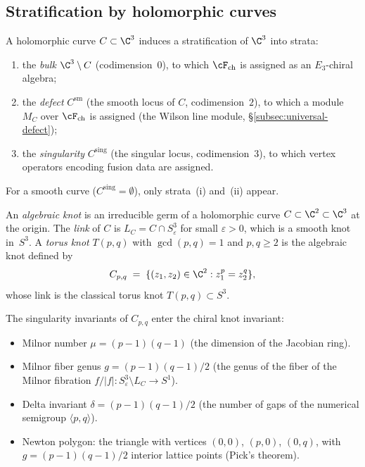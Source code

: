 \subsection{Stratification by holomorphic curves}
\label{subsec:strat-hol-curves}

A holomorphic curve $C \subset \C^3$ induces a stratification of $\C^3$ into strata:
\begin{enumerate}[label=\textup{(\roman*)}]
 \item the \emph{bulk} $\C^3 \setminus C$ (codimension~$0$), to which $\cF_{\mathrm{ch}}$ is assigned as an $E_3$-chiral algebra;
 \item the \emph{defect} $C^{\mathrm{sm}}$ (the smooth locus of $C$, codimension~$2$), to which a module $M_C$ over $\cF_{\mathrm{ch}}$ is assigned (the Wilson line module, \S\ref{subsec:universal-defect});
 \item the \emph{singularity} $C^{\mathrm{sing}}$ (the singular locus, codimension~$3$), to which vertex operators encoding fusion data are assigned.
\end{enumerate}
For a smooth curve ($C^{\mathrm{sing}} = \emptyset$), only strata~(i) and~(ii) appear.

\begin{definition}
\label{def:algebraic-knot}
An \emph{algebraic knot} is an irreducible germ of a holomorphic curve $C \subset \C^2 \subset \C^3$ at the origin. The \emph{link} of $C$ is $L_C = C \cap S^3_\varepsilon$ for small $\varepsilon > 0$, which is a smooth knot in~$S^3$. A \emph{torus knot} $T(p, q)$ with $\gcd(p, q) = 1$ and $p, q \geq 2$ is the algebraic knot defined by
\[
 C_{p,q} \;=\; \{(z_1, z_2) \in \C^2 : z_1^p = z_2^q\},
\]
whose link is the classical torus knot $T(p, q) \subset S^3$.
\end{definition}

The singularity invariants of $C_{p,q}$ enter the chiral knot invariant:
\begin{itemize}
 \item Milnor number $\mu = (p - 1)(q - 1)$ (the dimension of the Jacobian ring).
 \item Milnor fiber genus $g = (p - 1)(q - 1)/2$ (the genus of the fiber of the Milnor fibration $f/|f| \colon S^3_\varepsilon \setminus L_C \to S^1$).
 \item Delta invariant $\delta = (p-1)(q-1)/2$ (the number of gaps of the numerical semigroup $\langle p, q \rangle$).
 \item Newton polygon: the triangle with vertices $(0,0)$, $(p,0)$, $(0,q)$, with $g = (p-1)(q-1)/2$ interior lattice points (Pick's theorem).
\end{itemize}


